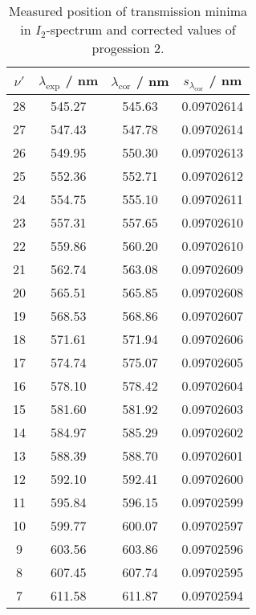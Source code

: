 \begin{table}[H]
\caption{Measured position of transmission minima in $I_2$-spectrum and corrected values of progession 2.}
\begin{center}
\begin{tabular}{|c|c|c|c|}
  \hline
  $\nu'$ & $\lambda_{\text{exp}}$ / nm & $\lambda_{\text{cor}}$ / nm & $s_{\lambda_{\text{cor}}}$ / nm \\ \hline
  28 & 545.27 & 545.63 & 0.09702614 \\ \hline
  27 & 547.43 & 547.78 & 0.09702614 \\ \hline
  26 & 549.95 & 550.30 & 0.09702613 \\ \hline
  25 & 552.36 & 552.71 & 0.09702612 \\ \hline
  24 & 554.75 & 555.10 & 0.09702611 \\ \hline
  23 & 557.31 & 557.65 & 0.09702610 \\ \hline
  22 & 559.86 & 560.20 & 0.09702610 \\ \hline
  21 & 562.74 & 563.08 & 0.09702609 \\ \hline
  20 & 565.51 & 565.85 & 0.09702608 \\ \hline
  19 & 568.53 & 568.86 & 0.09702607 \\ \hline
  18 & 571.61 & 571.94 & 0.09702606 \\ \hline
  17 & 574.74 & 575.07 & 0.09702605 \\ \hline
  16 & 578.10 & 578.42 & 0.09702604 \\ \hline
  15 & 581.60 & 581.92 & 0.09702603 \\ \hline
  14 & 584.97 & 585.29 & 0.09702602 \\ \hline
  13 & 588.39 & 588.70 & 0.09702601 \\ \hline
  12 & 592.10 & 592.41 & 0.09702600 \\ \hline
  11 & 595.84 & 596.15 & 0.09702599 \\ \hline
  10 & 599.77 & 600.07 & 0.09702597 \\ \hline
  9 & 603.56 & 603.86 & 0.09702596 \\ \hline
  8 & 607.45 & 607.74 & 0.09702595 \\ \hline
  7 & 611.58 & 611.87 & 0.09702594 \\ \hline
\end{tabular}
\end{center}
\label{tab:prog2}
\end{table}
